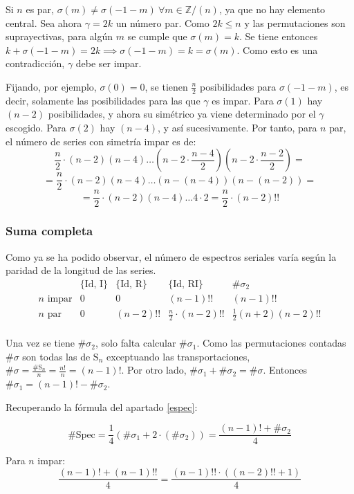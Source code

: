 		Si $n$ es par, $\sigma(m)\neq\sigma(-1-m)\ \forall m\in \mathbb{Z} / (n)$, ya que no hay elemento central. Sea ahora $\gamma=2k$ un número par. Como $2k\leq n$ y las permutaciones son suprayectivas, para algún $m$ se cumple que $\sigma(m)=k$. Se tiene entonces $k+\sigma(-1-m)=2k\implies\sigma(-1-m)=k=\sigma(m)$. Como esto es una contradicción, $\gamma$ debe ser impar.
		
		Fijando, por ejemplo, $\sigma(0)=0$, se tienen $\frac{n}{2}$ posibilidades para $\sigma(-1-m)$, es decir, solamente las posibilidades para las que $\gamma$ es impar. Para $\sigma(1)$ hay $(n-2)$ posibilidades, y ahora su simétrico ya viene determinado por el $\gamma$ escogido. Para $\sigma(2)$ hay $(n-4)$, y así sucesivamente. \cite{reiner} Por tanto, para $n$ par, el número de series con simetría impar es de: 
		\[\frac{n}{2}\cdot(n-2)(n-4)\ldots(n-2\cdot\frac{n-4}{2})(n-2\cdot\frac{n-2}{2})=\]
		\[=\frac{n}{2}\cdot(n-2)(n-4)\ldots(n-(n-4))(n-(n-2))=\]
		\[=\frac{n}{2}\cdot(n-2)(n-4)\ldots4\cdot2=\frac{n}{2}\cdot(n-2)!!\]
			
	\subsubsection*{Suma completa}
		Como ya se ha podido observar, el número de espectros seriales varía según la paridad de la longitud de las series.		
		\def\arraystretch{1.5}
		\[\begin{array}{c|c|c|c|c}
		&\{\mbox{Id, I}\}&\{\mbox{Id, R}\}&\{\mbox{Id, RI}\}&\#\sigma_2\\\hline
		n\mbox{ impar}&0&0&(n-1)!!&(n-1)!!\\\hline
		n\mbox{ par}&0&(n-2)!!&\frac{n}{2}\cdot(n-2)!!&\frac{1}{2}(n+2)(n-2)!!\\
		\end{array}\]
		\def\arraystretch{1}
		
		Una vez se tiene $\#\sigma_2$, solo falta calcular $\#\sigma_1$. Como las permutaciones contadas $\#\sigma$ son todas las de $\mbox{S}_n$ exceptuando las transportaciones, $\#\sigma=\frac{\#\mbox{S}_n}{n}=\frac{n!}{n}=(n-1)!$. Por otro lado, $\#\sigma_1 +\#\sigma_2=\#\sigma$. Entonces $\#\sigma_1=(n-1)!-\#\sigma_2$.
		
		Recuperando la fórmula del apartado \ref{espec}:
		
		\[\#\mbox{Spec}=
		\frac{1}{4}\left(\#\sigma_1+2\cdot(\#\sigma_2)\right)=
		\frac{(n-1)!+\#\sigma_2}{4}\]
		
		Para $n$ impar:
		\[\frac{(n-1)!+(n-1)!!}{4}=\frac{(n-1)!!\cdot\left((n-2)!!+1\right)}{4}\]
		
